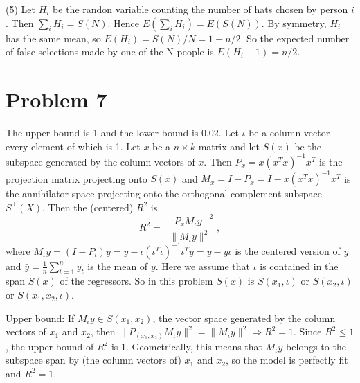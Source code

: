 \documentclass[12pt]{amsart}
\begin{document}
(5)  Let $H_i$ be the randon variable counting the number of hats chosen by person $i$. Then $\sum_i H_i = S(N)$. Hence $E(\sum_iH_i)=E(S(N))$. By symmetry, $H_i$ has the same mean, so $E(H_i)=S(N)/N=1+n/2$. So the expected number of false selections made by
one of the N people is $E(H_i-1)=n/2$. 

\section{Problem 7}
The upper bound is 1 and the lower bound is 0.02.  Let $\iota$ be a column vector every element of which is 1. Let $x$ be a $n\times k$ matrix and let $S(x)$ be the subspace generated by the column vectors of $x$. Then
$P_x=x(x^Tx)^{-1}x^T$ is the projection matrix projecting onto $S(x)$ and $M_x=I-P_x=I-x(x^Tx)^{-1}x^T$ is the annihilator space projecting onto the orthogonal complement subspace $S^{\bot}(X)$. Then the (centered) $R^2$ is
$$R^2=\frac{\|P_xM_{\iota}y\|^2}{\|M_{\iota}y\|^2},$$
where $M_{\iota}y=(I-P_{\iota})y=y-\iota(\iota^T\iota)^{-1}\iota^Ty=y-\bar{y}\iota$ is the centered version of $y$ and $\bar{y}=\frac{1}{n}\sum_{t=1}^ny_t$ is the mean of $y$. Here we assume that $\iota$ is contained in the span $S(x)$ of the regressors. So in this problem
$S(x)$ is $S(x_1,\iota)$ or $S(x_2,\iota)$ or $S(x_1,x_2,\iota)$. 
 
 
 Upper bound: If $M_{\iota}y\in S(x_1,x_2)$, the vector space generated by the column vectors of $x_1$ and $x_2$, then $\|P_{(x_1,x_2)}M_{\iota}y\|^2=\|M_{\iota}y\|^2\Rightarrow R^2=1$. Since $R^2\leq 1$, the upper bound of $R^2$ is 1. Geometrically, this means that $M_{\iota}y$ belongs to the subspace span by (the column vectors of) $x_1$ and $x_2$, so the model is perfectly fit and $R^2=1$.
 
\end{document}
